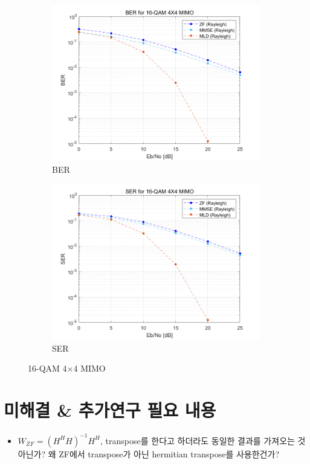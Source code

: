\documentclass{article}
\begin{document}
\begin{figure}[H]
\begin{subfigure}{0.5\textwidth}
		\centerline{\includegraphics[width=1\textwidth]{d_Eb_BER.png}}
		\caption{BER}
	\end{subfigure}%
	\begin{subfigure}{0.5\textwidth}
		\centerline{\includegraphics[width=1\textwidth]{d_Eb_SER.png}}
		\caption{SER}
	\end{subfigure}%
	\caption{16-QAM 4$\times$4 MIMO}
\end{figure}
\section{미해결 \& 추가연구 필요 내용}
\begin{itemize}
  \item $W_{ZF}=(H^H H)^{-1}H^H$, transpose를 한다고 하더라도 동일한 결과를 가져오는 것 아닌가? 왜 ZF에서 transpose가 아닌 hermitian transpose를 사용한건가?
\end{itemize}
\end{document}
